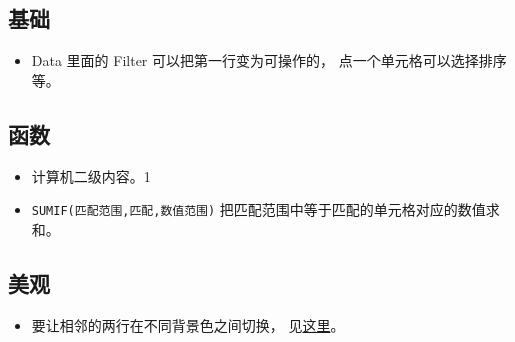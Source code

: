 
\begin{issues}
\issueDraft
\end{issues}

\subsection{基础}
\begin{itemize}
\item Data 里面的 Filter 可以把第一行变为可操作的， 点一个单元格可以选择排序等。
\end{itemize}

\subsection{函数}
\begin{itemize}
\item 计算机二级内容。1
\item \verb|SUMIF(匹配范围,匹配,数值范围)| 把匹配范围中等于匹配的单元格对应的数值求和。
\end{itemize}

\subsection{美观}
\begin{itemize}
\item 要让相邻的两行在不同背景色之间切换， 见\href{https://support.office.com/en-us/article/apply-shading-to-alternate-rows-or-columns-in-a-worksheet-a443b0f5-2025-42f6-9099-5de09c05e880}{这里}。
\end{itemize}
